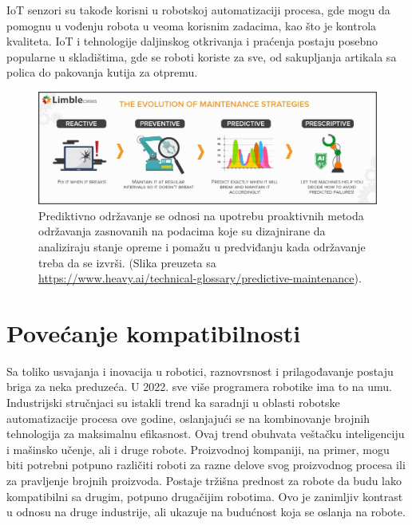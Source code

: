 \documentclass{article}
\begin{document}
	IoT senzori su takođe korisni u robotskoj automatizaciji procesa, gde mogu da pomognu u vođenju robota u veoma korisnim zadacima, kao što je kontrola kvaliteta. IoT i tehnologije daljinskog otkrivanja i praćenja postaju posebno popularne u skladištima, gde se roboti koriste za sve, od sakupljanja artikala sa polica do pakovanja kutija za otpremu.
	\cite{robotics2022}
    \begin{figure}
     \centering
	   \includegraphics[scale=0.37]{dijagram.jpeg}
	   \caption{Prediktivno održavanje se odnosi na upotrebu proaktivnih metoda održavanja zasnovanih na podacima koje su dizajnirane da analiziraju stanje opreme i pomažu u predviđanju kada održavanje treba da se izvrši. (Slika preuzeta sa \url{https://www.heavy.ai/technical-glossary/predictive-maintenance}).}
    \end{figure}
   

\newpage
	\section{Povećanje kompatibilnosti}
	Sa toliko usvajanja i inovacija u robotici, raznovrsnost i prilagođavanje postaju briga za neka preduzeća. U 2022. sve više programera robotike ima to na umu. Industrijski stručnjaci su istakli trend ka saradnji \cite{4 Robotic Process Automation (RPA) trends to watch in 2022} u oblasti robotske automatizacije procesa ove godine, oslanjajući se na kombinovanje brojnih tehnologija za maksimalnu efikasnost.
	Ovaj trend obuhvata veštačku inteligenciju i mašinsko učenje, ali i druge robote. Proizvodnoj kompaniji, na primer, mogu biti potrebni potpuno različiti roboti za razne delove svog proizvodnog procesa ili za pravljenje brojnih proizvoda. Postaje tržišna prednost za robote da budu lako kompatibilni sa drugim, potpuno drugačijim robotima. Ovo je zanimljiv kontrast u odnosu na druge industrije, ali ukazuje na budućnost koja se oslanja na robote.
	\cite{robotics2022}
  

 
\end{document}
